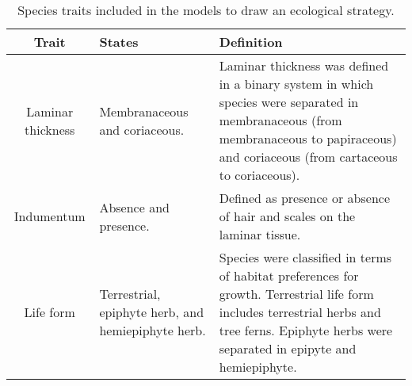 \documentclass[12pt]{article}
\begin{document}

\begin{table}[!hb]
    \caption{ Species traits included in the models to draw an ecological strategy.}\label{trait}
  \begin{tabular}{cp{4cm}p{6cm}}
\hline
\bf{Trait}	&	\bf{States}	&	\bf{Definition} 	\\
\hline
Laminar thickness	&	Membranaceous and coriaceous.	&	Laminar thickness was defined in a binary system in which species were separated in membranaceous (from membranaceous to papiraceous) and coriaceous (from cartaceous to coriaceous).	 \\
Indumentum	&	Absence and presence.	&	Defined as presence or absence of hair and scales on the laminar tissue.  \\
Life form	&	Terrestrial, epiphyte herb, and hemiepiphyte herb.	&	Species were classified in terms of habitat preferences for growth. Terrestrial life form includes terrestrial herbs and tree ferns. Epiphyte herbs were separated in epipyte and hemiepiphyte. \\
\hline
\end{tabular}
\end{table}


\newpage
\end{document}
